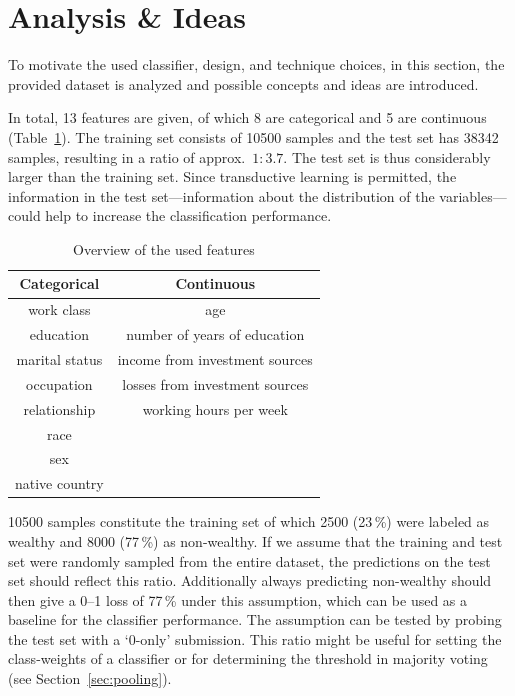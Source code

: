 \documentclass[a4paper,11pt]{article}
\begin{document}
\section{Analysis \& Ideas}
\label{sec:analysis}

To motivate the used classifier, design, and technique choices, in
this section, the provided dataset is analyzed and possible concepts
and ideas are introduced.

In total, 13 features are given, of which 8 are categorical and 5 are
continuous (Table~\ref{tab:features}).
The training set consists of 10500 samples and the test set has 38342
samples, resulting in a ratio of approx.\ $1:3.7$.  The test set is
thus considerably larger than the training set.
Since transductive learning is permitted, the information in the test
set---information about the distribution of the variables---could help
to increase the classification performance.

\begin{table}[h]
  \centering
  \begin{tabular}{cc}
    \toprule
  Categorical  & Continuous                     \\
    \midrule
    work class & age                            \\
    education  & number of years of education   \\
marital status & income from investment sources \\
occupation     & losses from investment sources \\
relationship   & working hours per week         \\
race           &                                \\
sex            &                                \\
native country &                                \\
      \bottomrule
  \end{tabular}
  \caption{{Overview of the used features}}
  \label{tab:features}
\end{table}

10500 samples constitute the training set of which 2500 (23\,\%) were
labeled as wealthy and 8000 (77\,\%) as non-wealthy. If we assume that
the training and test set were randomly sampled from the entire
dataset, the predictions on the test set should reflect this
ratio. Additionally always predicting non-wealthy should then give a
0--1 loss of 77\,\% under this assumption, which can be used as a
baseline for the classifier performance. The assumption can be tested
by probing the test set with a `0-only' submission. This ratio might
be useful for setting the class-weights of a classifier or for
determining the threshold in majority voting
(see
Section~\ref{sec:pooling}).
\end{document}
